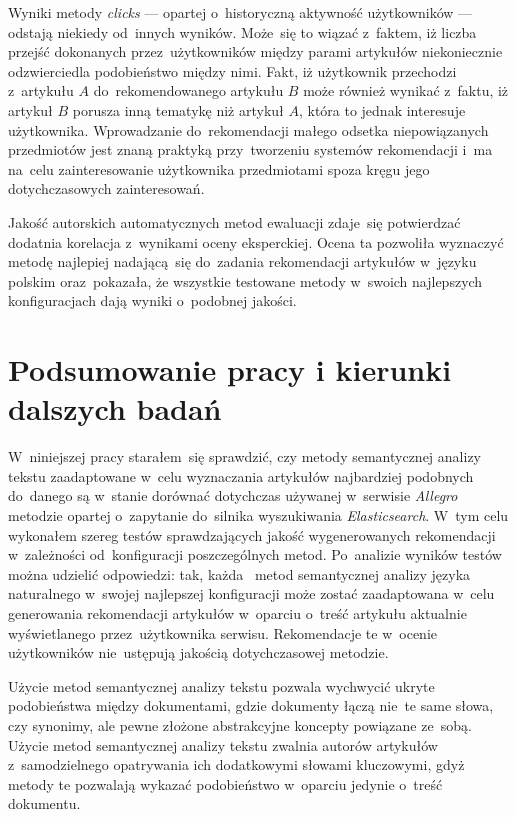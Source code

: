 \documentclass[pl]{minipw} %
\begin{document}
Wyniki metody \textit{clicks} --- opartej o~historyczną aktywność użytkowników --- odstają niekiedy od~innych wyników. Może~się to wiązać z~faktem, iż liczba przejść dokonanych przez~użytkowników między parami artykułów niekoniecznie odzwierciedla podobieństwo między nimi. Fakt, iż użytkownik przechodzi z~artykułu $A$ do~rekomendowanego artykułu $B$ może również wynikać z~faktu, iż artykuł $B$ porusza inną tematykę niż artykuł $A$, która to jednak interesuje użytkownika. Wprowadzanie do~rekomendacji małego odsetka niepowiązanych przedmiotów jest znaną praktyką przy~tworzeniu systemów rekomendacji i~ma na~celu zainteresowanie użytkownika przedmiotami spoza kręgu jego dotychczasowych zainteresowań.

Jakość autorskich automatycznych metod ewaluacji zdaje~się potwierdzać dodatnia korelacja z~wynikami oceny eksperckiej. Ocena ta pozwoliła wyznaczyć metodę najlepiej nadającą~się do~zadania rekomendacji artykułów w~języku polskim oraz~pokazała, że wszystkie testowane metody w~swoich najlepszych konfiguracjach dają wyniki o~podobnej jakości. 


\chapter{Podsumowanie pracy i kierunki dalszych badań}

W~niniejszej pracy starałem~się sprawdzić, czy metody semantycznej analizy tekstu zaadaptowane w~celu wyznaczania artykułów najbardziej podobnych do~danego są w~stanie dorównać dotychczas używanej w~serwisie \textit{Allegro} metodzie opartej o~zapytanie do~silnika wyszukiwania \textit{Elasticsearch}. W~tym celu wykonałem szereg testów sprawdzających jakość wygenerowanych rekomendacji w~zależności od~konfiguracji poszczególnych metod. Po~analizie wyników testów można udzielić odpowiedzi: tak, każda~ metod semantycznej analizy języka naturalnego w~swojej najlepszej konfiguracji może zostać zaadaptowana w~celu generowania rekomendacji artykułów w~oparciu o~treść artykułu aktualnie wyświetlanego przez~użytkownika serwisu. Rekomendacje te w~ocenie użytkowników nie~ustępują jakością dotychczasowej metodzie. 

Użycie metod semantycznej analizy tekstu pozwala wychwycić ukryte podobieństwa między dokumentami, gdzie dokumenty łączą nie~te same słowa, czy synonimy, ale pewne złożone abstrakcyjne koncepty powiązane ze~sobą. Użycie metod semantycznej analizy tekstu zwalnia autorów artykułów z~samodzielnego opatrywania ich dodatkowymi słowami kluczowymi, gdyż metody te pozwalają wykazać podobieństwo w~oparciu jedynie o~treść dokumentu.
\end{document}
